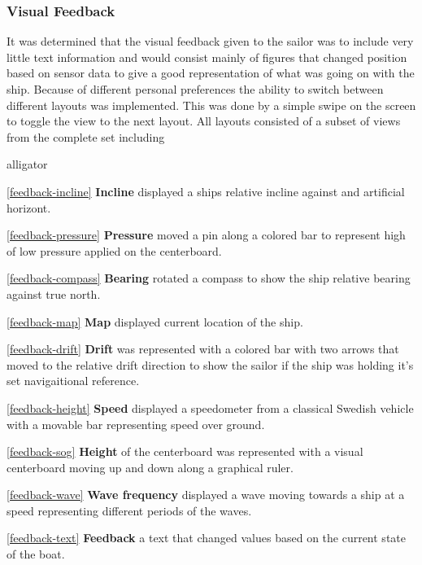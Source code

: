 \subsubsection{Visual Feedback}
It was determined that the visual feedback given to the sailor was to include very little text information and would consist mainly of figures that changed position based on sensor data to give a good representation of what was going on with the ship. Because of different personal preferences the ability to switch between different layouts was implemented. This was done by a simple swipe on the screen to toggle the view to the next layout. All layouts consisted of a subset of views from the complete set including
\begin{labeling}{alligator}
\item [\ref{feedback-incline} \textbf{Incline}]  displayed a ships relative incline against and artificial horizont.
\item [\ref{feedback-pressure} \textbf{Pressure}] moved a pin along a colored bar to represent high of low pressure applied on the centerboard.
\item [\ref{feedback-compass} \textbf{Bearing}] rotated a compass to show the ship relative bearing against true north.
\item [\ref{feedback-map} \textbf{Map}] displayed current location of the ship.
\item [\ref{feedback-drift} \textbf{Drift}] was represented with a colored bar with two arrows that moved to the relative drift direction to show the sailor if the ship was holding it's set navigaitional reference.
\item [\ref{feedback-height} \textbf{Speed}] displayed a speedometer from a classical Swedish vehicle\cite{volvo} with a movable bar representing speed over ground.
\item [\ref{feedback-sog} \textbf{Height}] of the centerboard was represented with a visual centerboard moving up and down along a graphical ruler.
\item [\ref{feedback-wave} \textbf{Wave frequency}] displayed a wave moving towards a ship at a speed representing different periods of the waves.
\item [\ref{feedback-text} \textbf{Feedback}] a text that changed values based on the current state of the boat.
\end{labeling}

